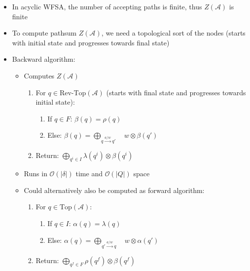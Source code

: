\begin{itemize}
    \item In acyclic WFSA, the number of accepting paths is finite, thus $Z(\mathcal{A})$ is finite
    \item To compute pathsum $Z(\mathcal{A})$, we need a topological sort of the nodes (starts with initial state and progresses towards final state)
    \item Backward algorithm:
    \begin{itemize}
        \item Computes $Z(\mathcal{A})$
        \begin{enumerate}
            \item For $q \in \textrm{Rev-Top}(\mathcal{A})$ (starts with final state and progresses towards initial state):
            \begin{enumerate}
                \item If $q \in F$: $
                \beta(q) = \rho(q)
                $
                \item Else: $
                \beta(q) = \bigoplus_{q \xrightarrow{a/w} q'} \quad w \otimes \beta(q')
                $
            \end{enumerate}
            \item Return:
            $
            \bigoplus_{q^i \in I} \lambda(q^i) \otimes \beta(q^i)
            $
        \end{enumerate}
        \item Runs in $\mathcal{O}(|\delta|)$ time and $\mathcal{O}(|Q|)$ space
        \item Could alternatively also be computed as forward algorithm:
        \begin{enumerate}
            \item For $q \in \textrm{Top}(\mathcal{A})$:
            \begin{enumerate}
                \item If $q \in I$: $
                \alpha(q) = \lambda(q)
                $
                \item Else: $
                \alpha(q) = \bigoplus_{q' \xrightarrow{a/w} q} \quad w \otimes \alpha(q')
                $
            \end{enumerate}
            \item Return:
            $
            \bigoplus_{q^f \in F} \rho(q^f) \otimes \beta(q^f)
            $
        \end{enumerate}
    \end{itemize}
\end{itemize}
